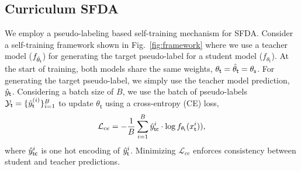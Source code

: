 \documentclass[10pt,twocolumn,letterpaper]{article}
\begin{document}
\subsection{Curriculum SFDA}
We employ a pseudo-labeling based self-training mechanism for SFDA. Consider a self-training framework shown in Fig.~\ref{fig:framework} where we use a teacher model ($f_{\Hat{\theta}_\mathsf{t}}$) for generating the target pseudo-label for a student model ($f_{\theta_\mathsf{t}}$). At the start of training, both models share the same weights, \ie $\theta_\mathsf{t} = \Hat{\theta}_\mathsf{t} = \theta_\mathsf{s}$. For generating the target pseudo-label, we simply use the teacher model prediction, $\Hat{y}_\mathsf{t}$. 
Considering a batch size of $B$, we use the batch of pseudo-labels $\mathcal{Y}_\mathsf{t} = \{\Hat{y}_\mathsf{t}^{(i)}\}_{i=1}^{B}$ to update $\theta_\mathsf{t}$  using a cross-entropy (CE) loss,
\begin{equation}
    \vspace{-0.01cm}
    \mathcal{L}_{ce} = - \frac{1}{B}\sum_{i=1}^{B}{\Hat{y}_\mathsf{tc}^i \cdot \log f_{\theta_\mathsf{t}}(x_\mathsf{t}^i))}, 
    \vspace{-1mm}
\end{equation}
where $\Hat{y}_\mathsf{tc}^i$ is one hot encoding of $\Hat{y}_\mathsf{t}^i$. Minimizing $\mathcal{L}_{ce}$ enforces consistency between student and teacher predictions. 
\end{document}
